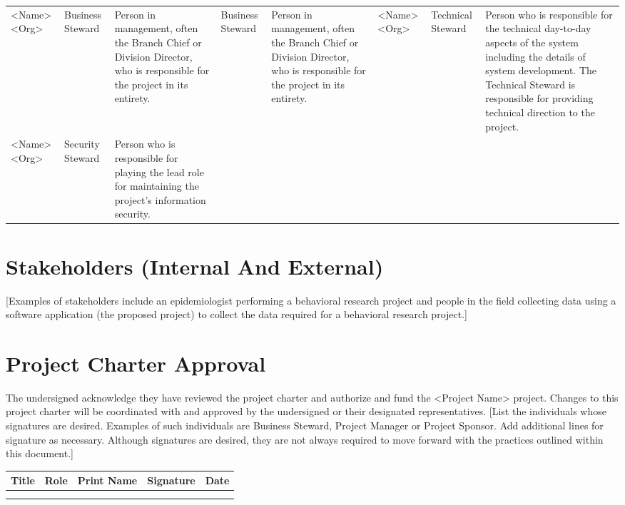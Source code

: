 \documentclass[11pt]{article}
\begin{document}
\begin{center}
\begin{tabular}{llllllll}
<Name><Org> & Business Steward & Person in management, often the Branch Chief or Division Director, who is responsible for the project in its entirety. & Business Steward & Person in management, often the Branch Chief or Division Director, who is responsible for the project in its entirety. & <Name><Org> & Technical Steward & Person who is responsible for the technical day-to-day aspects of the system including the details of system development.  The Technical Steward is responsible for providing technical direction to the project.\\
<Name><Org> & Security Steward & Person who is responsible for playing the lead role for maintaining the project’s information security. &  &  &  &  & \\
\end{tabular}
\end{center}
\section{Stakeholders (Internal And External)}
\label{sec:org1f50c5e}
[Examples of stakeholders include an epidemiologist performing a behavioral research project and people in the field collecting data using a software application (the proposed project) to collect the data required for a behavioral research project.]

\section{Project Charter Approval}
\label{sec:org70a3360}
The undersigned acknowledge they have reviewed the project charter and authorize and fund the <Project Name> project.  Changes to this project charter will be coordinated with and approved by the undersigned or their designated representatives.
[List the individuals whose signatures are desired.  Examples of such individuals are Business Steward, Project Manager or Project Sponsor.  Add additional lines for signature as necessary. Although signatures are desired, they are not always required to move forward with the practices outlined within this document.]

\begin{center}
\begin{tabular}{lllll}
Title & Role & Print Name & Signature & Date\\
\hline
 &  &  &  & \\
\hline
 &  &  &  & \\
\end{tabular}
\end{center}
\end{document}
